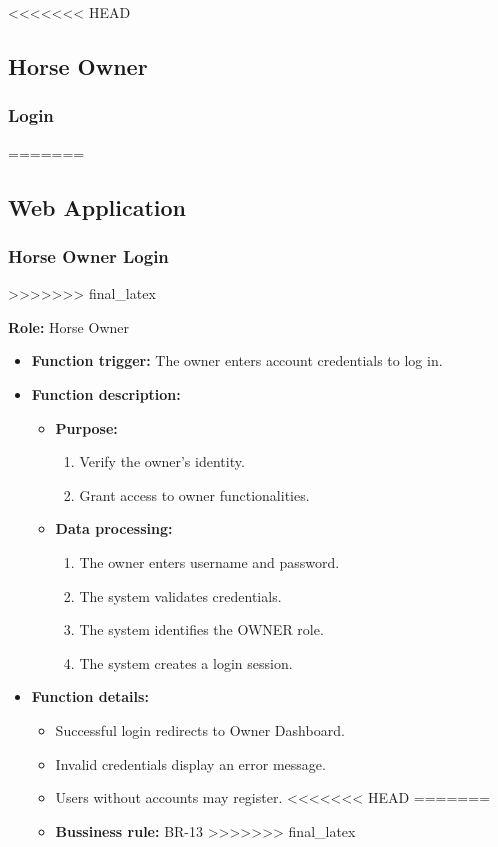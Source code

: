<<<<<<< HEAD
\subsection{Horse Owner}

\subsubsection{Login}
=======
\subsection{Web Application}

\subsubsection{Horse Owner Login}
>>>>>>> final_latex

\textbf{Role:} Horse Owner

\begin{itemize}
    \item \textbf{Function trigger:} The owner enters account credentials to log in.

    \item \textbf{Function description:}
    \begin{itemize}
        \item \textbf{Purpose:}
        \begin{enumerate}
            \item Verify the owner's identity.
            \item Grant access to owner functionalities.
        \end{enumerate}

        \item \textbf{Data processing:}
        \begin{enumerate}
            \item The owner enters username and password.
            \item The system validates credentials.
            \item The system identifies the OWNER role.
            \item The system creates a login session.
        \end{enumerate}
    \end{itemize}

    \item \textbf{Function details:}
    \begin{itemize}
        \item Successful login redirects to Owner Dashboard.
        \item Invalid credentials display an error message.
        \item Users without accounts may register.
<<<<<<< HEAD
=======
        \item \textbf{Bussiness rule:} BR-13
>>>>>>> final_latex
    \end{itemize}
\end{itemize}

